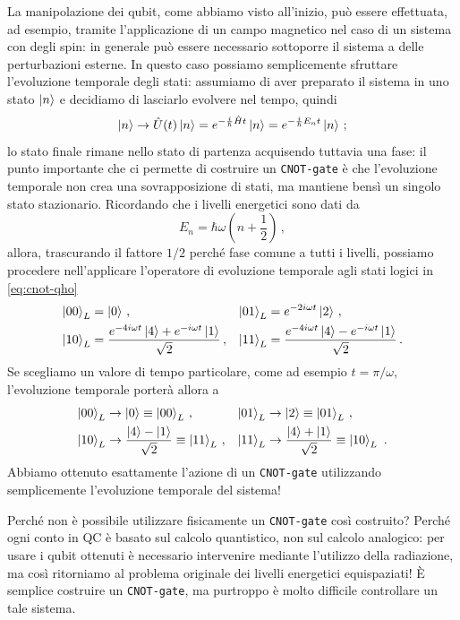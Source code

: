 \begin{esempio}
    \noindent La manipolazione dei qubit, come abbiamo visto all'inizio, può essere effettuata, ad esempio, tramite l'applicazione di un campo magnetico nel caso di un sistema con degli spin: in generale può essere necessario sottoporre il sistema a delle perturbazioni esterne. In questo caso possiamo semplicemente sfruttare l'evoluzione temporale degli stati: assumiamo di aver preparato il sistema in uno stato $\ket{n}$ e decidiamo di lasciarlo evolvere nel tempo, quindi
    \begin{equation*}
        \ket n \rightarrow \hat{U}(t) \ket{n} =  e^{-\frac{i}{\hbar}\hat{H} t} \ket{n} = e^{-\frac{i}{\hbar} E_n t} \ket{n} \, ;
    \end{equation*}
    lo stato finale rimane nello stato di partenza acquisendo tuttavia una fase: il punto importante che ci permette di costruire un \texttt{CNOT-gate} è che l'evoluzione temporale non crea una sovrapposizione di stati, ma mantiene bensì un singolo stato stazionario. Ricordando che i livelli energetici sono dati da
    \begin{equation*}
        E_n = \hbar \omega \left(n+\frac 12\right) \, ,
    \end{equation*}
    allora, trascurando il fattore $1/2$ perché fase comune a tutti i livelli, possiamo procedere nell'applicare l'operatore di evoluzione temporale agli stati logici in \eqref{eq:cnot-qho}
    \begin{align*}
        \ket{00}_L &= \ket{0} \, , &\ket{01}_L &= e^{-2i\omega t}\ket{2} \, , \\
        \ket{10}_L &= \frac{e^{-4i\omega t}\ket{4}+e^{-i\omega t}\ket{1}}{\sqrt 2} \, , &\ket{11}_L &= \frac{e^{-4i\omega t}\ket{4}-e^{-i\omega t}\ket{1}}{\sqrt 2} \, .
    \end{align*}
    Se scegliamo un valore di tempo particolare, come ad esempio $t=\pi/\omega$, l'evoluzione temporale porterà allora a
    \begin{align*}
        \ket{00}_L &\rightarrow \ket{0} \equiv \ket{00}_L \, , &\ket{01}_L &\rightarrow \ket{2} \equiv \ket{01}_L \, , \\
        \ket{10}_L &\rightarrow \frac{\ket{4}-\ket{1}}{\sqrt 2} \equiv \ket{11}_L \, , &\ket{11}_L &\rightarrow \frac{\ket{4}+\ket{1}}{\sqrt 2} \equiv \ket{10}_L \, \, .
    \end{align*}
    Abbiamo ottenuto esattamente l'azione di un \texttt{CNOT-gate} utilizzando semplicemente l'evoluzione temporale del sistema!
\end{esempio}

\noindent Perché non è possibile utilizzare fisicamente un \texttt{CNOT-gate} così costruito? Perché ogni conto in QC è basato sul calcolo quantistico, non sul calcolo analogico: per usare i qubit ottenuti è necessario intervenire mediante l'utilizzo della radiazione, ma così ritorniamo al problema originale dei livelli energetici equispaziati! È semplice costruire un \texttt{CNOT-gate}, ma purtroppo è molto difficile controllare un tale sistema.  

